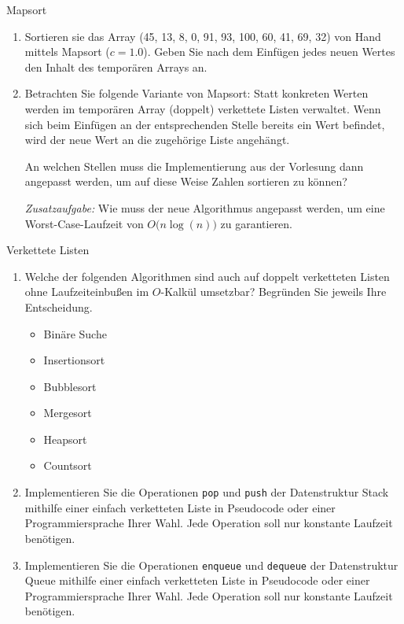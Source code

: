 \documentclass[11pt,a4paper]{article}
\begin{document}
\begin{aufgabe}{2}{Mapsort}
    \begin{enumerate}
        \item 
        Sortieren sie das Array (45, 13, 8, 0, 91, 93, 100, 60, 41, 69, 32) von Hand mittels Mapsort ($c = 1.0$).
        Geben Sie nach dem Einfügen jedes neuen Wertes den Inhalt des temporären Arrays an.
        \item
        Betrachten Sie folgende Variante von Mapsort:
        Statt konkreten Werten werden im temporären Array (doppelt) verkettete Listen verwaltet.
        Wenn sich beim Einfügen an der entsprechenden Stelle bereits ein Wert befindet, wird der neue Wert an die zugehörige Liste angehängt.

        An welchen Stellen muss die Implementierung aus der Vorlesung dann angepasst werden, um auf diese Weise Zahlen sortieren zu können?
        
        \emph{Zusatzaufgabe:} Wie muss der neue Algorithmus angepasst werden, um eine Worst-Case-Laufzeit von $O\big(n \log(n)\big)$ zu garantieren.
    \end{enumerate}
\end{aufgabe}

\begin{aufgabe}{3}{Verkettete Listen}
    \begin{enumerate}
        \item 
        Welche der folgenden Algorithmen sind auch auf doppelt verketteten Listen ohne Laufzeiteinbußen im $O$-Kalkül umsetzbar?
        Begründen Sie jeweils Ihre Entscheidung.
        \begin{multicols}{3}
        \begin{itemize}
            \item Binäre Suche
            \item Insertionsort
            \item Bubblesort
            \item Mergesort
            \item Heapsort
            \item Countsort
        \end{itemize}
        \end{multicols}
        \item Implementieren Sie die Operationen \texttt{pop} und \texttt{push} der Datenstruktur \glqq{}Stack\grqq{} mithilfe einer einfach verketteten Liste in Pseudocode oder einer Programmiersprache Ihrer Wahl.
        Jede Operation soll nur konstante Laufzeit benötigen.
        \item Implementieren Sie die Operationen \texttt{enqueue} und \texttt{dequeue} der Datenstruktur \glqq{}Queue\grqq{} mithilfe einer einfach verketteten Liste in Pseudocode oder einer Programmiersprache Ihrer Wahl.
        Jede Operation soll nur konstante Laufzeit benötigen.
    \end{enumerate}
\end{aufgabe}
\end{document}
